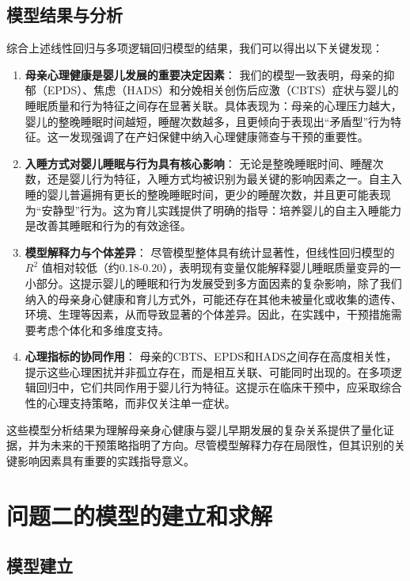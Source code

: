 \documentclass[withoutpreface,bwprint]{cumcmthesis}
\begin{document}
\subsection{模型结果与分析}
综合上述线性回归与多项逻辑回归模型的结果，我们可以得出以下关键发现：

\begin{enumerate}
    \item \textbf{母亲心理健康是婴儿发展的重要决定因素}：
    我们的模型一致表明，母亲的抑郁（EPDS）、焦虑（HADS）和分娩相关创伤后应激（CBTS）症状与婴儿的睡眠质量和行为特征之间存在显著关联。具体表现为：母亲的心理压力越大，婴儿的整晚睡眠时间越短，睡醒次数越多，且更倾向于表现出“矛盾型”行为特征。这一发现强调了在产妇保健中纳入心理健康筛查与干预的重要性。
    \item \textbf{入睡方式对婴儿睡眠与行为具有核心影响}：
    无论是整晚睡眠时间、睡醒次数，还是婴儿行为特征，入睡方式均被识别为最关键的影响因素之一。自主入睡的婴儿普遍拥有更长的整晚睡眠时间，更少的睡醒次数，并且更可能表现为“安静型”行为。这为育儿实践提供了明确的指导：培养婴儿的自主入睡能力是改善其睡眠和行为的有效途径。
    \item \textbf{模型解释力与个体差异}：
    尽管模型整体具有统计显著性，但线性回归模型的 $R^2$ 值相对较低（约0.18-0.20），表明现有变量仅能解释婴儿睡眠质量变异的一小部分。这提示婴儿的睡眠和行为发展受到多方面因素的复杂影响，除了我们纳入的母亲身心健康和育儿方式外，可能还存在其他未被量化或收集的遗传、环境、生理等因素，从而导致显著的个体差异。因此，在实践中，干预措施需要考虑个体化和多维度支持。
    \item \textbf{心理指标的协同作用}：
    母亲的CBTS、EPDS和HADS之间存在高度相关性，提示这些心理困扰并非孤立存在，而是相互关联、可能同时出现的。在多项逻辑回归中，它们共同作用于婴儿行为特征。这提示在临床干预中，应采取综合性的心理支持策略，而非仅关注单一症状。
\end{enumerate}
这些模型分析结果为理解母亲身心健康与婴儿早期发展的复杂关系提供了量化证据，并为未来的干预策略指明了方向。尽管模型解释力存在局限性，但其识别的关键影响因素具有重要的实践指导意义。



\section{问题二的模型的建立和求解}
\subsection{模型建立}
\end{document}
